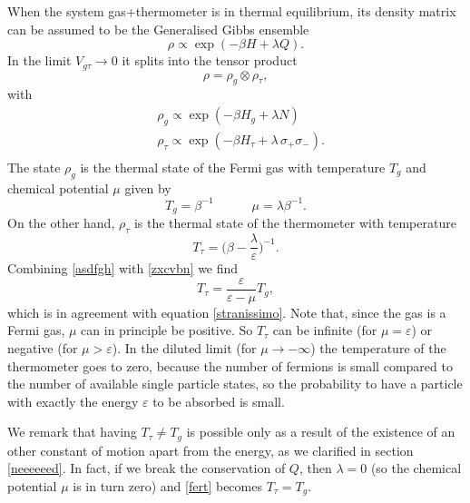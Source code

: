 \documentclass[twocolumn,usenatbib]{mnras2}
\newcommand{\spc}{\quad \quad \quad}
\begin{document}
When the system gas+thermometer is in thermal equilibrium, its density matrix can be assumed to be the Generalised Gibbs ensemble \citep{Perarnau_Llobet_2016}
\begin{equation}
\rho \propto \exp(-\beta H +\lambda Q).
\end{equation}
In the limit $V_{g\tau} \rightarrow 0$ it splits into the tensor product
\begin{equation}
\rho = \rho_g \otimes \rho_\tau,
\end{equation}
with
\begin{equation}
\begin{split}
& \rho_g \propto \exp(-\beta H_g +\lambda N) \\
&  \rho_\tau \propto \exp(-\beta H_\tau +\lambda \, \sigma_+ \sigma_-) .\\
\end{split}
\end{equation}
The state $\rho_g$ is the thermal state of the Fermi gas with temperature $T_g$ and chemical potential $\mu$ given by
\begin{equation}\label{asdfgh}
T_g = \beta^{-1}  \spc  \mu = \lambda \beta^{-1}.
\end{equation}
On the other hand, $\rho_\tau$ is the thermal state of the thermometer with temperature
\begin{equation}\label{zxcvbn}
T_\tau = \bigg( \beta - \dfrac{\lambda}{\varepsilon} \bigg)^{-1}.
\end{equation}
Combining \eqref{asdfgh} with \eqref{zxcvbn} we find
\begin{equation}\label{fert}
T_\tau = \dfrac{\varepsilon}{\varepsilon -\mu} T_g,
\end{equation}
which is in agreement with equation \eqref{stranissimo}. Note that, since the gas is a Fermi gas, $\mu$ can in principle be positive. So $T_\tau$ can be infinite (for $\mu = \varepsilon$) or negative (for $\mu > \varepsilon$). In the diluted limit (for $\mu \rightarrow -\infty$) the temperature of the thermometer goes to zero, because the number of fermions is small compared to the number of available single particle states, so the probability to have a particle with exactly the energy $\varepsilon$ to be absorbed is small.

We remark that having $T_\tau \neq T_g$ is possible only as a result of the existence of an other constant of motion apart from the energy, as we clarified in section \ref{neeeeeed}. In fact, if we break the conservation of $Q$, then $\lambda =0$ (so the chemical potential $\mu$ is in turn zero) and \eqref{fert} becomes $T_\tau = T_g$.
\end{document}
